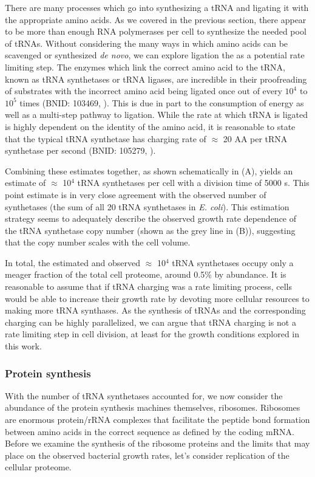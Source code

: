 There  are many processes which go into synthesizing a tRNA and ligating it
with the appropriate amino acids. As we covered  in the previous section, there
appear to be more than enough RNA polymerases per cell to synthesize the needed
pool of tRNAs. Without considering the many ways in which amino acids can be
scavenged or synthesized \textit{de novo}, we can explore ligation the as a potential rate limiting
step. The enzymes which link the correct amino acid to the tRNA, known as tRNA
synthetases or tRNA ligases, are incredible in their proofreading of substrates
with the incorrect amino acid being ligated once out of every $10^4$ to $10^5$
times (BNID: 103469, \cite{milo2010}). This is due in part to the consumption of
energy  as well as a multi-step pathway to ligation. While the rate at which
tRNA is ligated is highly dependent on the identity of the amino acid, it is
reasonable to state that the typical tRNA synthetase has charging rate of
$\approx$ 20 AA per tRNA synthetase per second (BNID: 105279, \cite{milo2010}).

Combining these estimates together, as shown schematically in
(A), yields an estimate of $\approx$ 10$^4$ tRNA
synthetases per cell with a division time of 5000 s. This point estimate is in
very close agreement with the observed number of synthetases (the sum of all 20
tRNA synthetases in \textit{E. coli}). This estimation strategy seems to
adequately describe the observed growth rate dependence of the tRNA synthetase copy
number (shown as the grey line in (B)), suggesting that
the copy number scales with the cell volume.

In total, the estimated and observed $\approx$ 10$^4$ tRNA synthetases occupy
only a meager fraction of the total cell proteome, around 0.5\% by abundance. It
is reasonable to assume that if tRNA charging was a rate limiting process, cells
would be able to increase their growth rate by devoting more cellular resources
to making more tRNA synthases. As the synthesis of tRNAs and the corresponding
charging can be highly parallelized, we can argue that tRNA charging is not a
rate limiting step in cell division, at least for the growth conditions explored
in this work.

\subsubsection{Protein synthesis}
With the number of tRNA synthetases accounted for, we now consider the abundance
of the protein synthesis machines themselves, ribosomes. Ribosomes are enormous
protein/rRNA complexes that facilitate the peptide bond formation between amino
acids in the correct sequence as defined by the coding mRNA. Before we examine
the synthesis of the ribosome proteins and the limits that may place on the
observed bacterial growth rates, let's consider replication of the cellular
proteome.

